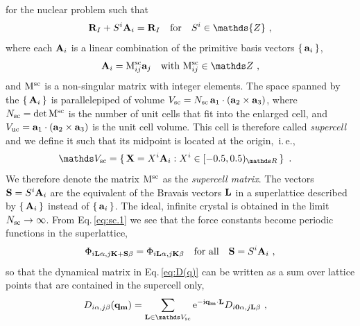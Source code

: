  for the nuclear problem such that
\begin{align}
	\b R_I + S^i \b A_i = \b R_I \quad\text{for}\quad S^i \in \mathds{Z}~,
	\label{eq:sc.1}
\end{align}
where each ${\bf A}_i$ is a linear combination of the primitive basis vectors $\set{{\bf a}_i}$,
\begin{align}
{\bf A}_i = {\rm M}_{ij}^{\rm sc} {\bf a}_j\quad\text{with } {\rm M}_{ij}^{\rm sc} \in \mathds Z~,
\end{align}
and $\rm M^{\rm sc}$ is a non-singular matrix with integer elements. The space spanned by the $\set{{\bf A}_i}$ is parallelepiped of volume $V_{\rm sc} = N_{\rm sc} \, {\bf a}_1 \cdot ({\bf a}_2 \times {\bf a}_3)$, where $N_{\rm sc} = \det {\rm M}^{\rm sc}$ is the number of unit cells that fit into the enlarged cell, and $V_{\rm uc} = {\bf a}_1 \cdot ({\bf a}_2 \times {\bf a}_3)$ is the unit cell volume. This cell is therefore called \emph{supercell} and we define it such that its midpoint is located at the origin,~i.\,e.,~
\begin{align}
	\mathds V_{\rm sc}
		&= \set{{\bf X} = X^i {\bf A}_i : X^i \in {[-0.5, 0.5)_{\mathds R}}}~.
	\label{eq:supercell}
\end{align}
We therefore denote the matrix ${\rm M}^{\rm sc}$ as the \emph{supercell matrix}.
The vectors \mbox{${\bf S} = S^i {\bf A}_i$} are the equivalent of the Bravais vectors ${\bf L}$ in a superlattice described by $\set{ {\bf A}_i }$ instead of $\set{ {\bf a}_i}$.
The ideal, infinite crystal is obtained in the limit $N_{\rm sc} \rightarrow \infty$.
From Eq.\,\eqref{eq:sc.1} we see that the force constants become periodic functions in the superlattice,
\begin{align}
	\Phi_{i {\bf L} \alpha, j {\bf K} + \b S \beta} 
		= \Phi_{i {\bf L} \alpha, j {\bf K} \beta} \quad\text{for all}\quad \b S = S^i \b A_i~,
	\label{eq:fc.sym.2}
\end{align}
so that the dynamical matrix in Eq.\,\eqref{eq:D(q)} can be written as a sum over lattice points that are contained in the supercell only,
\begin{align}
	{D}_{i \alpha, j \beta} (\b q_{\bf m}) 	
		&= %
	\sum_{\b L \in \mathds V_{\rm sc}} {\rm e}^{- \im \b q_{\bf m} \cdot \b L} {D}_{i \b 0 \alpha, j \b L \beta}~,
	\label{eq:D^S(q).2}
\end{align}
